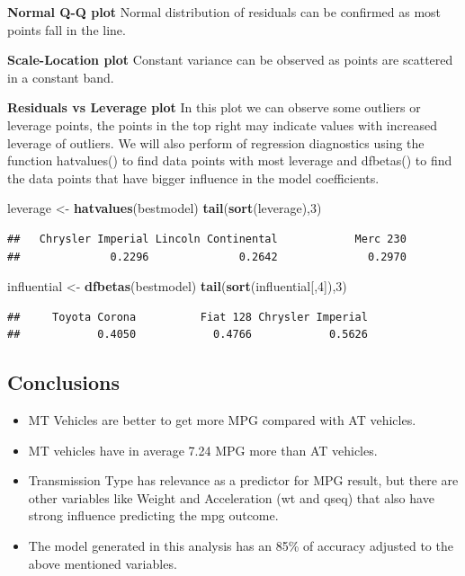 \documentclass[]{article}
\newenvironment{Shaded}{\begin{snugshade}}{\end{snugshade}}
\newcommand{\KeywordTok}[1]{\textcolor[rgb]{0.13,0.29,0.53}{\textbf{{#1}}}}
\newcommand{\DecValTok}[1]{\textcolor[rgb]{0.00,0.00,0.81}{{#1}}}
\newcommand{\StringTok}[1]{\textcolor[rgb]{0.31,0.60,0.02}{{#1}}}
\newcommand{\NormalTok}[1]{{#1}}
\begin{document}
\textbf{Normal Q-Q plot} Normal distribution of residuals can be
confirmed as most points fall in the line.

\textbf{Scale-Location plot} Constant variance can be observed as points
are scattered in a constant band.

\textbf{Residuals vs Leverage plot} In this plot we can observe some
outliers or leverage points, the points in the top right may indicate
values with increased leverage of outliers. We will also perform of
regression diagnostics using the function hatvalues() to find data
points with most leverage and dfbetas() to find the data points that
have bigger influence in the model coefficients.

\begin{Shaded}
\begin{Highlighting}[]
\NormalTok{leverage <-}\StringTok{ }\KeywordTok{hatvalues}\NormalTok{(bestmodel)}
\KeywordTok{tail}\NormalTok{(}\KeywordTok{sort}\NormalTok{(leverage),}\DecValTok{3}\NormalTok{)}
\end{Highlighting}
\end{Shaded}

\begin{verbatim}
##   Chrysler Imperial Lincoln Continental            Merc 230 
##              0.2296              0.2642              0.2970
\end{verbatim}

\begin{Shaded}
\begin{Highlighting}[]
\NormalTok{influential <-}\StringTok{ }\KeywordTok{dfbetas}\NormalTok{(bestmodel)}
\KeywordTok{tail}\NormalTok{(}\KeywordTok{sort}\NormalTok{(influential[,}\DecValTok{4}\NormalTok{]),}\DecValTok{3}\NormalTok{)}
\end{Highlighting}
\end{Shaded}

\begin{verbatim}
##     Toyota Corona          Fiat 128 Chrysler Imperial 
##            0.4050            0.4766            0.5626
\end{verbatim}

\subsection{Conclusions}\label{conclusions}

\begin{itemize}
\itemsep1pt\parskip0pt
\item
  MT Vehicles are better to get more MPG compared with AT vehicles.
\item
  MT vehicles have in average 7.24 MPG more than AT vehicles.
\item
  Transmission Type has relevance as a predictor for MPG result, but
  there are other variables like Weight and Acceleration (wt and qseq)
  that also have strong influence predicting the mpg outcome.
\item
  The model generated in this analysis has an 85\% of accuracy adjusted
  to the above mentioned variables.
\end{itemize}
\end{document}

